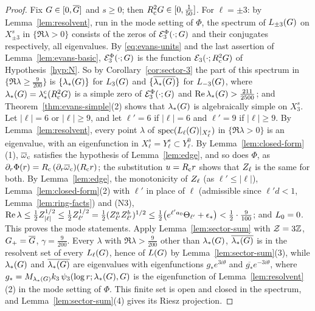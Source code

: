 \begin{proof}
Fix $G\in[0,\overline{G}]$ and $s\ge0$; then $R_{\mathrm{c}}^2G\in[0,\frac1{50}]$. For $\ell=\pm3$: by
Lemma~\ref{lem:resolvent}, run in the mode setting of $\Phi$, the spectrum of
$L_{\pm3}(G)$ on $X^s_{\pm3}$ in $\{\Re\lambda>0\}$ consists of the zeros of
$\mathcal{E}^\Phi_3(\cdot;G)$ and their conjugates respectively, all eigenvalues. By
\eqref{eq:evans-units} and the last assertion of Lemma~\ref{lem:evans-basic},
$\mathcal{E}^\Phi_3(\cdot;G)$ is the function $\mathcal{E}_3(\cdot;R_{\mathrm{c}}^2G)$ of
Hypothesis~\ref{hyp:N}. So by Corollary~\ref{cor:sector-3} the part of this
spectrum in $\{\Re\lambda\ge\frac9{200}\}$ is $\{\lambda_*(G)\}$ for $L_{3}(G)$ and
$\{\overline{\lambda_*(G)}\}$ for $L_{-3}(G)$, where
$\lambda_*(G)=\lambda_*^{\mathrm c}(R_{\mathrm{c}}^2G)$ is a simple zero of $\mathcal{E}^\Phi_3(\cdot;G)$
and $\Re\lambda_*(G)>\frac{211}{2500}$; and Theorem~\ref{thm:evans-simple}(2) shows
that $\lambda_*(G)$ is algebraically simple on $X^s_3$. Let $|\ell|=6$ or
$|\ell|\ge9$, and let $\ell'=6$ if $|\ell|=6$ and $\ell'=9$ if $|\ell|\ge9$. By
Lemma~\ref{lem:resolvent}, every point $\lambda$ of
$\operatorname{spec}(L_{\ell}(G)|_{X^s_\ell})$ in $\{\Re\lambda>0\}$ is an eigenvalue, with an
eigenfunction in $X^s_\ell=Y^s_\ell\subset Y^0_\ell$. By
Lemma~\ref{lem:closed-form}(1), $\overline{\omega}_{\mathrm{c}}$ satisfies the hypothesis of
Lemma~\ref{lem:edge}, and so does $\Phi$, as $\partial_r\Phi(r)=R_{\mathrm{c}}\,(\partial_r\overline{\omega}_{\mathrm{c}})(R_{\mathrm{c}} r)$; the
substitution $u=R_{\mathrm{c}} r$ shows that $Z_\ell$ is the same for both. By
Lemma~\ref{lem:edge}, the monotonicity of $Z_\ell$ (as $\ell'\le|\ell|$),
Lemma~\ref{lem:closed-form}(2) with $\ell'$ in place of $\ell$ (admissible since
$\ell'd<1$, Lemma~\ref{lem:ring-facts}) and (N3),
$\Re\lambda\le\tfrac12Z_{|\ell|}^{1/2}\le\tfrac12Z_{\ell'}^{1/2}
=\tfrac12(Z^a_{\ell'}Z^b_{\ell'})^{1/2}
\le\tfrac12\big(e^{\ell'a_0}\Theta_{\ell'}+\epsilon_*\big)<\tfrac12\cdot\tfrac9{100}$;
and $L_{0}=0$. This proves the mode statements. Apply Lemma~\ref{lem:sector-sum} with
$\mathcal Z=3\mathbb{Z}$, $G_+=\overline{G}$, $\gamma=\frac9{200}$. Every $\lambda$ with
$\Re\lambda>\frac9{200}$ other than $\lambda_*(G)$, $\overline{\lambda_*(G)}$ is in the
resolvent set of every $L_{\ell}(G)$, hence of $L(G)$ by
Lemma~\ref{lem:sector-sum}(3), while $\lambda_*(G)$ and $\overline{\lambda_*(G)}$ are
eigenvalues with eigenfunctions $g_*e^{3i\theta}$ and $\overline{g_*}e^{-3i\theta}$,
where $g_*=M_{\lambda_*(G)}k_3\,\psi_3(\log r;\lambda_*(G),G)$ is the
eigenfunction of Lemma~\ref{lem:resolvent}(2) in the mode setting of $\Phi$.
This finite set is open and closed in the spectrum, and
Lemma~\ref{lem:sector-sum}(4) gives its Riesz projection.
\end{proof}


